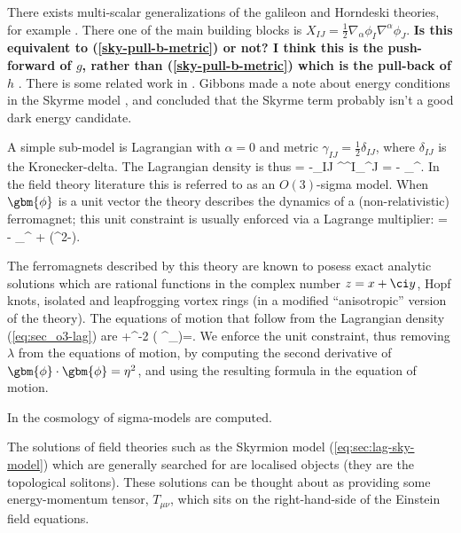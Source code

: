 There exists multi-scalar generalizations of the galileon and Horndeski theories, for example \cite{Deffayet:2010zh, Padilla:2010de, Hinterbichler:2010xn, Padilla:2012dx}. There one of the main building blocks is $X_{IJ}  = \tfrac{1}{2}\nabla_{\alpha}\phi_I \nabla^{\alpha}\phi_J$. \textbf{Is this equivalent to (\ref{sky-pull-b-metric}) or not? I think this is the push-forward of $g$, rather than (\ref{sky-pull-b-metric}) which is the pull-back of $h$ }. There is some related work in \cite{Padilla:2010ir}. Gibbons made a note about energy conditions in the Skyrme model \cite{Gibbons:2003cp}, and concluded that the Skyrme term probably isn't a good dark energy candidate.

A simple sub-model is Lagrangian with $\alpha=0$ and metric $\gamma_{IJ} =  \tfrac{1}{2}\delta_{IJ}$, where $\delta_{IJ}$ is the Kronecker-delta. The Lagrangian density is thus
\bea
\ld = -\delta_{IJ} \partial^{\mu}\phi^I\partial_{\mu}\phi^J = - \partial_{\mu}\gbm{\phi}\cdot\partial^{\mu}\gbm{\phi}.
\eea
In the field theory literature this is referred to as an $O(3)$-sigma model. When $\gbm{\phi}$ is a unit vector the theory describes the dynamics of a (non-relativistic) ferromagnet; this unit constraint is usually enforced via a Lagrange multiplier:
\bea
\label{eq:sec_o3-lag}
\ld =  - \partial_{\mu}\gbm{\phi}\cdot\partial^{\mu}\gbm{\phi} + \lambda\left(\eta^2-\gbm{\phi}\cdot\gbm{\phi}\right).
\eea

The ferromagnets described by this theory are known to posess exact analytic solutions which are rational functions in the complex number $z = x + \ci y$, Hopf knots,  isolated and leapfrogging vortex rings (in a modified ``anisotropic'' version of the theory). The equations of motion that follow from the Lagrangian density (\ref{eq:sec_o3-lag}) are
\bea
\square\gbm{\phi} +\eta^{-2} \left( \nabla^{\mu}\gbm{\phi}\cdot\nabla_{\mu}\gbm{\phi}\right)\gbm{\phi}=.
\eea
We enforce the unit constraint, thus removing $\lambda$ from the equations of motion, by computing the second derivative of $\gbm{\phi}\cdot\gbm{\phi}=\eta^2$, and using the resulting formula in the equation of motion. 

In \cite{Shchigolev:2013gfa} the cosmology of sigma-models are computed.

The solutions of field theories such as the Skyrmion model (\ref{eq:sec:lag-sky-model}) which are generally searched for are  localised objects (they are the topological solitons). These solutions can be thought about as providing some energy-momentum tensor, $T_{\mu\nu}$, which sits on the right-hand-side of the Einstein field equations.

